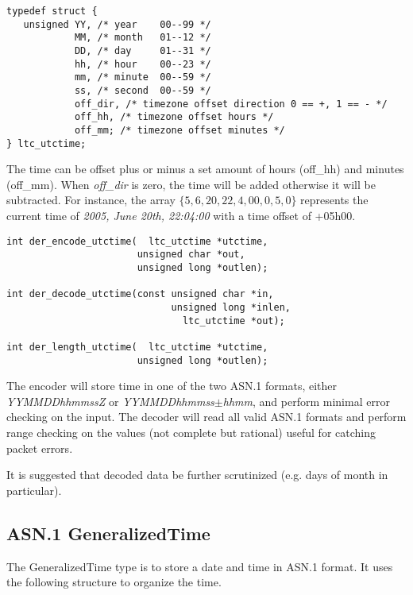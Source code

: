 \documentclass[synpaper]{book}
\begin{document}
\begin{verbatim}
typedef struct {
   unsigned YY, /* year    00--99 */
            MM, /* month   01--12 */
            DD, /* day     01--31 */
            hh, /* hour    00--23 */
            mm, /* minute  00--59 */
            ss, /* second  00--59 */
            off_dir, /* timezone offset direction 0 == +, 1 == - */
            off_hh, /* timezone offset hours */
            off_mm; /* timezone offset minutes */
} ltc_utctime;
\end{verbatim}

The time can be offset plus or minus a set amount of hours (off\_hh) and minutes (off\_mm).  When \textit{off\_dir} is zero, the time will be added otherwise it
will be subtracted.  For instance, the array $\lbrace 5, 6, 20, 22, 4, 00, 0, 5, 0 \rbrace$ represents the current time of
\textit{2005, June 20th, 22:04:00} with a time offset of +05h00.

\begin{verbatim}
int der_encode_utctime(  ltc_utctime *utctime,
                       unsigned char *out,
                       unsigned long *outlen);

int der_decode_utctime(const unsigned char *in,
                             unsigned long *inlen,
                               ltc_utctime *out);

int der_length_utctime(  ltc_utctime *utctime,
                       unsigned long *outlen);
\end{verbatim}

The encoder will store time in one of the two ASN.1 formats, either \textit{YYMMDDhhmmssZ} or \textit{YYMMDDhhmmss$\pm$hhmm}, and perform minimal error checking on the
input.  The decoder will read all valid ASN.1 formats and perform range checking on the values (not complete but rational) useful for catching packet errors.

It is suggested that decoded data be further scrutinized (e.g. days of month in particular).

\subsection{ASN.1 GeneralizedTime}

The GeneralizedTime type is to store a date and time in ASN.1 format.  It uses the following structure to organize the time.
\end{document}
